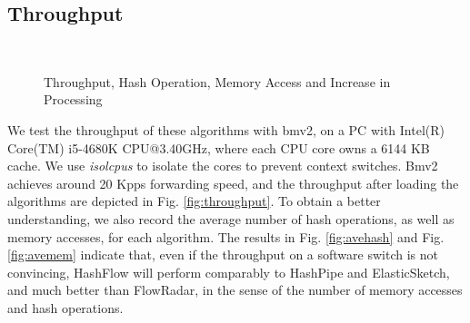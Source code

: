 \subsection{Throughput}
\label{subsec:throughput}
\begin{figure}[ht!]
	\centering
	\mbox{
	}
	\caption{Throughput, Hash Operation, Memory Access and Increase in Processing}
	\label{throughput}
\end{figure}
We test the throughput of these algorithms with bmv2, 
on a PC with Intel(R) Core(TM) i5-4680K CPU@3.40GHz, 
where each CPU core owns a 6144 KB cache. 
We  use \emph{isolcpus} to isolate the cores to prevent context switches.
Bmv2 achieves around 20 Kpps forwarding speed, 
and the throughput after loading the algorithms are depicted in Fig. \ref{fig:throughput}.
To obtain a better understanding, we also record the average number of 
hash operations, as well as memory accesses, for each algorithm. 
The  results in Fig. \ref{fig:avehash} and Fig. \ref{fig:avemem} indicate that, 
even if the throughput on a software switch is not convincing, 
HashFlow will perform comparably to HashPipe and ElasticSketch, 
and much better than FlowRadar, in the sense of the number of memory accesses and hash operations.

